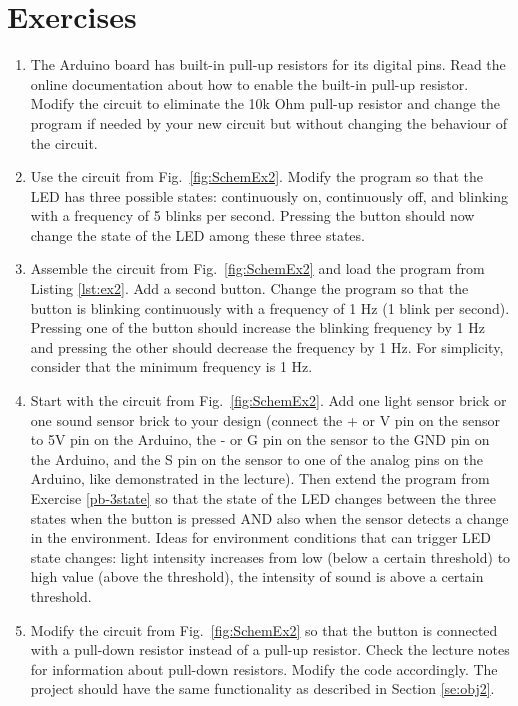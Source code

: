 \documentclass[12pt]{book}
\begin{document}
\section{Exercises}

\begin{enumerate}[1.]
\item The Arduino board has built-in pull-up resistors for its digital
  pins. Read the online documentation about how to enable the built-in
  pull-up resistor. Modify the circuit to eliminate the 10k Ohm
  pull-up resistor and change the program if needed by your new
  circuit but without changing the behaviour of the circuit.

\item\label{pb-3state} Use the circuit from
  Fig.~\ref*{fig:SchemEx2}. Modify the program so that the LED has
  three possible states: continuously on, continuously off, and
  blinking with a frequency of 5 blinks per second. Pressing the
  button should now change the state of the LED among these three
  states.

\item Assemble the circuit from Fig.~\ref*{fig:SchemEx2} and load the program from
  Listing \ref*{lst:ex2}. Add a second button. Change the program so
  that the button is blinking continuously with a frequency of 1 Hz (1
  blink per second). Pressing one of the button should increase the blinking
  frequency by 1 Hz and pressing the other should decrease the
  frequency by 1 Hz. For simplicity, consider that the minimum
  frequency is 1 Hz.

\item\label{pb-sensor} Start with the circuit from
  Fig.~\ref*{fig:SchemEx2}. Add one 
  light sensor brick or one sound sensor brick to your design (connect
  the + or V pin on the sensor to 5V pin on the Arduino, the - or G
  pin on the sensor to the GND pin on the Arduino, and the S pin on
  the sensor to one of the analog pins on the Arduino, like
  demonstrated in the lecture). Then extend the program from Exercise
  \ref{pb-3state} so that the state of the LED changes between the
  three states when the button is pressed AND also when the sensor
  detects a change in the environment. Ideas for environment
  conditions that can trigger LED state changes: light intensity
  increases from low (below a certain threshold) to high value (above
  the threshold), the intensity of sound is above a certain
  threshold.

\item Modify the circuit from Fig.~\ref{fig:SchemEx2} so that the button is connected with a pull-down resistor instead of a pull-up resistor. Check the lecture notes for information about pull-down resistors. Modify the code accordingly. The project should have the same functionality as described in Section \ref{se:obj2}.


\end{enumerate}
\end{document}

